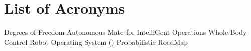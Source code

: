 \section*{List of Acronyms}

\begin{acronym}
			{Degrees of Freedom}
        {Autonomous Mate for IntelliGent Operations}
			{Whole-Body Control}
			{Robot Operating System (\citet{ROS})}
			{Probabilistic RoadMap}
\end{acronym}
